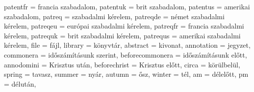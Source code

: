 {		patentfr         = {francia szabadalom},
		patentuk         = {brit szabadalom},
		patentus         = {amerikai szabadalom},
		patreq           = {szabadalmi k\'erelem},
		patreqde         = {n\'emet szabadalmi k\'erelem},
		patreqeu         = {eur\'opai szabadalmi k\'erelem},
		patreqfr         = {francia szabadalmi k\'erelem},
		patrequk         = {brit szabadalmi k\'erelem},
		patrequs         = {amerikai szabadalmi k\'erelem},
		file             = {f\'ajl},
		library          = {k\"onyvt\'ar},
		abstract         = {kivonat},
		annotation       = {jegyzet},
		commonera        = {id\H{o}sz\'am\'it\'asunk szerint},
		beforecommonera  = {id\H{o}sz\'am\'it\'asunk el\H{o}tt},
		annodomini       = {Krisztus ut\'an},
		beforechrist     = {Krisztus el\H{o}tt},
		circa            = {k\"or\"ulbel\"ul},
		spring           = {tavasz},
		summer           = {ny\'ar},
		autumn           = {\H{o}sz},
		winter           = {t\'el},
		am               = {d\'elel\H{o}tt},
		pm               = {d\'elut\'an},
}
